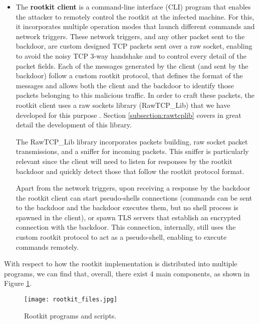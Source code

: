 \begin{itemize}
\item The \textbf{rootkit client} is a command-line interface (CLI) program that enables the attacker to remotely control the rootkit at the infected machine. For this, it incorporates multiple operation modes that launch different commands and network triggers. These network triggers, and any other packet sent to the backdoor, are custom designed TCP packets sent over a raw socket, enabling to avoid the noisy TCP 3-way handshake and to control every detail of the packet fields. Each of the messages generated by the client (and sent by the backdoor) follow a custom rootkit protocol, that defines the format of the messages and allows both the client and the backdoor to identify those packets belonging to this malicious traffic. In order to craft these packets, the rootkit client uses a raw sockets library (RawTCP\_Lib) that we have developed for this purpose \cite{rawtcp_lib}. Section \ref{subsection:rawtcplib} covers in great detail the development of this library.

The RawTCP\_Lib library incorporates packets building, raw socket packet transmissions, and a sniffer for incoming packets. This sniffer is particularly relevant since the client will need to listen for responses by the rootkit backdoor and quickly detect those that follow the rootkit protocol format.

Apart from the network triggers, upon receiving a response by the backdoor the rootkit client can start pseudo-shells connections (commands can be sent to the backdoor and the backdoor executes them, but no shell process is spawned in the client), or spawn TLS servers that establish an encrypted connection with the backdoor. This connection, internally, still uses the custom rootkit protocol to act as a pseudo-shell, enabling to execute commands remotely.
\end{itemize}


With respect to how the rootkit implementation is distributed into multiple programs, we can find that, overall, there exist 4 main components, as shown in Figure \ref{fig:rootkit_files}.

\begin{figure}[htbp]
	\centering
	\texttt{[image: rootkit\_files.jpg]}
	\caption{Rootkit programs and scripts.}
	\label{fig:rootkit_files}
\end{figure}

